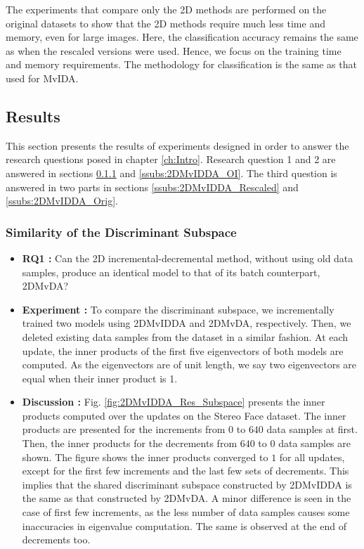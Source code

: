 The experiments that compare only the 2D methods are performed on the original datasets to show that the 2D methods require much less time and memory, even for large images. Here, the classification accuracy remains the same as when the rescaled versions were used. Hence, we focus on the training time and memory requirements. The methodology for classification is the same as that used for MvIDA.





\subsection{Results}
\label{subs:2DMvIDDA_Res}
This section presents the results of experiments designed in order to answer the research questions posed in chapter \ref{ch:Intro}. Research question 1 and 2 are answered in sections \ref{ssubs:2DMvIDDA_Subspace} and \ref{ssubs:2DMvIDDA_OI}. The third question is answered in two parts in sections \ref{ssubs:2DMvIDDA_Rescaled} and \ref{ssubs:2DMvIDDA_Orig}.

\subsubsection{Similarity of the Discriminant Subspace}
\label{ssubs:2DMvIDDA_Subspace}
\begin{itemize}
\item \textbf{RQ1 :}
Can the 2D incremental-decremental method, without using old data samples, produce an identical model to that of its batch counterpart, 2DMvDA?

\item \textbf{Experiment :}
To compare the discriminant subspace, we incrementally trained two models using 2DMvIDDA and 2DMvDA, respectively. Then, we deleted existing data samples from the dataset in a similar fashion. At each update, the inner products of the first five eigenvectors of both models are computed. As the eigenvectors are of unit length, we say two eigenvectors are equal when their inner product is 1.

\item \textbf{Discussion :}
Fig. \ref{fig:2DMvIDDA_Res_Subspace} presents the inner products computed over the updates on the Stereo Face dataset. The inner products are presented for the increments from $0$ to $640$ data samples at first. Then, the inner products for the decrements from $640$ to $0$ data samples are shown. The figure shows the inner products converged to $1$ for all updates, except for the first few increments and the last few sets of decrements. This implies that the shared discriminant subspace constructed by 2DMvIDDA is the same as that constructed by 2DMvDA. A minor difference is seen in the case of first few increments, as the less number of data samples causes some inaccuracies in eigenvalue computation. The same is observed at the end of decrements too.
\end{itemize}

